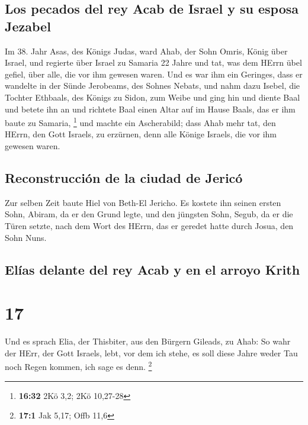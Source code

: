 \hypertarget{los-pecados-del-rey-acab-de-israel-y-su-esposa-jezabel}{%
\subsection{Los pecados del rey Acab de Israel y su esposa
Jezabel}\label{los-pecados-del-rey-acab-de-israel-y-su-esposa-jezabel}}

 Im 38. Jahr Asas, des Königs Judas, ward Ahab, der Sohn
Omris, König über Israel, und regierte über Israel zu Samaria 22 Jahre
 und tat, was dem HErrn übel gefiel, über alle, die vor
ihm gewesen waren.  Und es war ihm ein Geringes, dass er
wandelte in der Sünde Jerobeams, des Sohnes Nebats, und nahm dazu
Isebel, die Tochter Ethbaals, des Königs zu Sidon, zum Weibe und ging
hin und diente Baal und betete ihn an  und richtete Baal
einen Altar auf im Hause Baals, das er ihm baute zu Samaria, \footnote{\textbf{16:32}
  2Kö 3,2; 2Kö 10,27-28}  und machte ein Ascherabild;
dass Ahab mehr tat, den HErrn, den Gott Israels, zu erzürnen, denn alle
Könige Israels, die vor ihm gewesen waren.

\hypertarget{reconstrucciuxf3n-de-la-ciudad-de-jericuxf3}{%
\subsection{Reconstrucción de la ciudad de
Jericó}\label{reconstrucciuxf3n-de-la-ciudad-de-jericuxf3}}

 Zur selben Zeit baute Hiel von Beth-El Jericho. Es
kostete ihn seinen ersten Sohn, Abiram, da er den Grund legte, und den
jüngsten Sohn, Segub, da er die Türen setzte, nach dem Wort des HErrn,
das er geredet hatte durch Josua, den Sohn Nuns.

\hypertarget{eluxedas-delante-del-rey-acab-y-en-el-arroyo-krith}{%
\subsection{Elías delante del rey Acab y en el arroyo
Krith}\label{eluxedas-delante-del-rey-acab-y-en-el-arroyo-krith}}

\hypertarget{section-16}{%
\section{17}\label{section-16}}

 Und es sprach Elia, der Thisbiter, aus den Bürgern
Gileads, zu Ahab: So wahr der HErr, der Gott Israels, lebt, vor dem ich
stehe, es soll diese Jahre weder Tau noch Regen kommen, ich sage es
denn. \footnote{\textbf{17:1} Jak 5,17; Offb 11,6}

